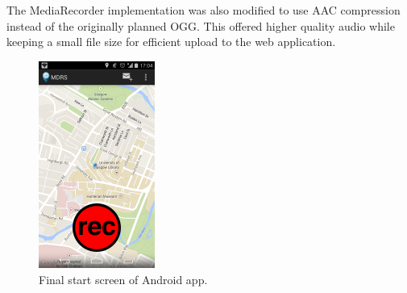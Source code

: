 \documentclass{l3proj}
\begin{document}
The MediaRecorder implementation was also modified to use AAC compression instead of the originally planned OGG. This offered higher quality audio while keeping a small file size for efficient upload to the web application.

\begin{figure}[ht!]
\centering
\includegraphics[width=0.34\textwidth]{images/start-screen-final.png}
\caption{Final start screen of Android app.}
\end{figure}
\end{document}
